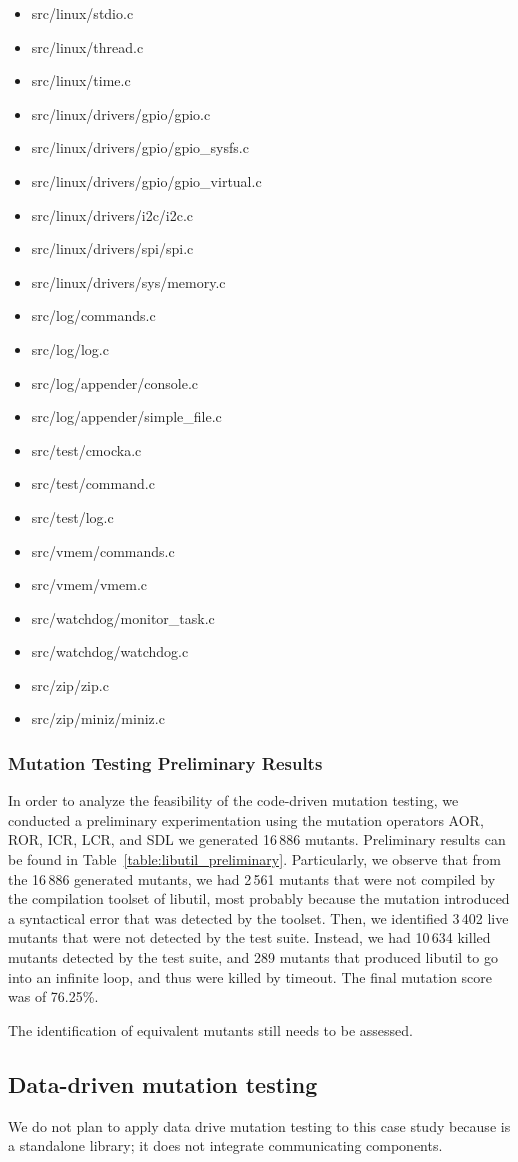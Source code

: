 \begin{itemize}
	\item src/linux/stdio.c
	\item src/linux/thread.c
	\item src/linux/time.c
	\item src/linux/drivers/gpio/gpio.c
	\item src/linux/drivers/gpio/gpio\_sysfs.c
	\item src/linux/drivers/gpio/gpio\_virtual.c
	\item src/linux/drivers/i2c/i2c.c
	\item src/linux/drivers/spi/spi.c
	\item src/linux/drivers/sys/memory.c
	\item src/log/commands.c
	\item src/log/log.c
	\item src/log/appender/console.c
	\item src/log/appender/simple\_file.c
	\item src/test/cmocka.c
	\item src/test/command.c
	\item src/test/log.c
	\item src/vmem/commands.c
	\item src/vmem/vmem.c
	\item src/watchdog/monitor\_task.c
	\item src/watchdog/watchdog.c
	\item src/zip/zip.c
	\item src/zip/miniz/miniz.c
\end{itemize}

\subsubsection{Mutation Testing Preliminary Results}




In order to analyze the feasibility of the code-driven mutation testing, we conducted a preliminary experimentation using the mutation operators AOR, ROR, ICR, LCR, and SDL we generated 16\,886 mutants. Preliminary results can be found in Table~\ref{table:libutil_preliminary}.
Particularly, we observe that from the 16\,886 generated mutants, we had 2\,561 mutants that were not compiled by the compilation toolset of libutil, most probably because the mutation introduced a syntactical error that was detected by the toolset.
Then, we identified 3\,402 live mutants that were not detected by the test suite. Instead, we had 10\,634 killed mutants detected by the test suite, and 289 mutants that produced libutil to go into an infinite loop, and thus were killed by timeout. The final mutation score was of 76.25\%.

The identification of equivalent mutants still needs to be assessed.


\subsection{Data-driven mutation testing}

We do not plan to apply data drive mutation testing to this case study because is a standalone library; it does not integrate communicating components.
